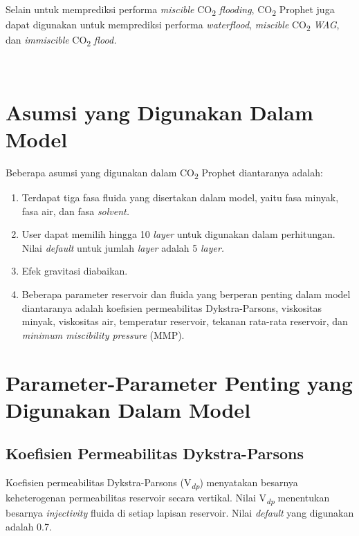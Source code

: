 \documentclass[
]{book}
\providecommand{\tightlist}{%
  \setlength{\itemsep}{0pt}\setlength{\parskip}{0pt}}
\begin{document}
~

Selain untuk memprediksi performa \emph{miscible} CO\textsubscript{2} \emph{flooding}, CO\textsubscript{2} Prophet juga dapat digunakan untuk memprediksi performa \emph{waterflood}, \emph{miscible} CO\textsubscript{2} \emph{WAG}, dan \emph{immiscible} CO\textsubscript{2} \emph{flood.}

~

\hypertarget{asumsi-yang-digunakan-dalam-model}{%
\section{Asumsi yang Digunakan Dalam Model}\label{asumsi-yang-digunakan-dalam-model}}

Beberapa asumsi yang digunakan dalam CO\textsubscript{2} Prophet diantaranya adalah:

\begin{enumerate}
\def\labelenumi{\arabic{enumi}.}
\tightlist
\item
  Terdapat tiga fasa fluida yang disertakan dalam model, yaitu fasa minyak, fasa air, dan fasa \emph{solvent.}
\item
  User dapat memilih hingga 10 \emph{layer} untuk digunakan dalam perhitungan. Nilai \emph{default} untuk jumlah \emph{layer} adalah 5 \emph{layer.}
\item
  Efek gravitasi diabaikan.
\item
  Beberapa parameter reservoir dan fluida yang berperan penting dalam model diantaranya adalah koefisien permeabilitas Dykstra-Parsons, viskositas minyak, viskositas air, temperatur
  reservoir, tekanan rata-rata reservoir, dan \emph{minimum miscibility pressure} (MMP).
\end{enumerate}

\hypertarget{parameter-parameter-penting-yang-digunakan-dalam-model}{%
\section{Parameter-Parameter Penting yang Digunakan Dalam Model}\label{parameter-parameter-penting-yang-digunakan-dalam-model}}

\hypertarget{koefisien-permeabilitas-dykstra-parsons}{%
\subsection{Koefisien Permeabilitas Dykstra-Parsons}\label{koefisien-permeabilitas-dykstra-parsons}}

Koefisien permeabilitas Dykstra-Parsons (V\textsubscript{\emph{dp}}) menyatakan besarnya keheterogenan permeabilitas reservoir secara vertikal. Nilai V\textsubscript{\emph{dp}} menentukan besarnya \emph{injectivity} fluida di setiap lapisan reservoir. Nilai \emph{default} yang digunakan adalah 0.7.
\end{document}
